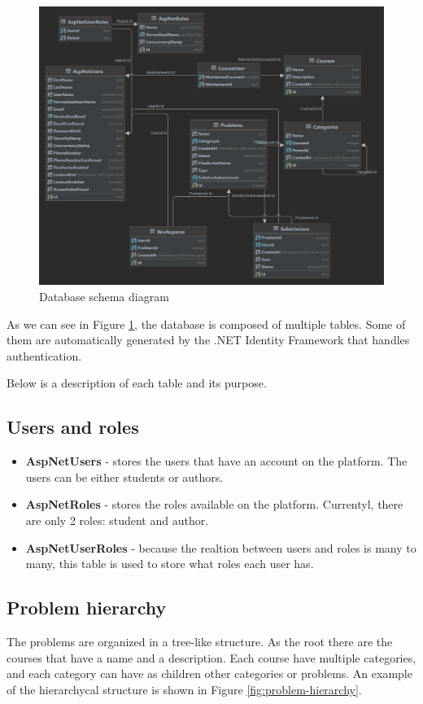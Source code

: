 \documentclass[12pt,a4paper]{report}
\begin{document}
\begin{figure}[h]
	\centering
	\includegraphics[width=\linewidth]{pics/database-schema.png}
	\caption{Database schema diagram}
	\label{fig:database-schema}
\end{figure}

As we can see in Figure \ref{fig:database-schema}, the database is composed of multiple tables. Some of them are automatically generated by the .NET Identity Framework that handles authentication.

Below is a description of each table and its purpose.

\newpage
\subsection{Users and roles}
\begin{itemize}
	\item \textbf{AspNetUsers} - stores the users that have an account on the platform. The users can be either students or authors.
	\item \textbf{AspNetRoles} - stores the roles available on the platform. Currentyl, there are only 2 roles: student and author.
	\item \textbf{AspNetUserRoles} - because the realtion between users and roles is many to many, this table is used to store what roles each user has.
\end{itemize}

\subsection{Problem hierarchy}
The problems are organized in a tree-like structure. As the root there are the courses that have a name and a description. Each course have multiple categories, and each category can have as children other categories or problems. An example of the hierarchycal structure is shown in Figure \ref{fig:problem-hierarchy}.
\end{document}
